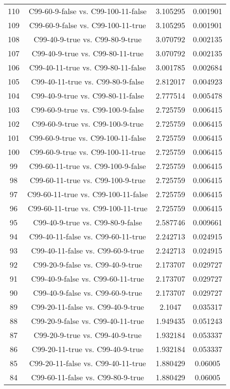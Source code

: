 \documentclass[a4paper,10pt]{article}
\begin{document}
\begin{landscape}
\begin{table}[!htp]
\begin{tabular}{cccc}
110&C99-60-9-false vs. C99-100-11-false&3.105295&0.001901\\
109&C99-60-9-false vs. C99-100-11-true&3.105295&0.001901\\
108&C99-40-9-true vs. C99-80-9-true&3.070792&0.002135\\
107&C99-40-9-true vs. C99-80-11-true&3.070792&0.002135\\
106&C99-40-11-true vs. C99-80-11-false&3.001785&0.002684\\
105&C99-40-11-true vs. C99-80-9-false&2.812017&0.004923\\
104&C99-40-9-true vs. C99-80-11-false&2.777514&0.005478\\
103&C99-60-9-true vs. C99-100-9-false&2.725759&0.006415\\
102&C99-60-9-true vs. C99-100-9-true&2.725759&0.006415\\
101&C99-60-9-true vs. C99-100-11-false&2.725759&0.006415\\
100&C99-60-9-true vs. C99-100-11-true&2.725759&0.006415\\
99&C99-60-11-true vs. C99-100-9-false&2.725759&0.006415\\
98&C99-60-11-true vs. C99-100-9-true&2.725759&0.006415\\
97&C99-60-11-true vs. C99-100-11-false&2.725759&0.006415\\
96&C99-60-11-true vs. C99-100-11-true&2.725759&0.006415\\
95&C99-40-9-true vs. C99-80-9-false&2.587746&0.009661\\
94&C99-40-11-false vs. C99-60-11-true&2.242713&0.024915\\
93&C99-40-11-false vs. C99-60-9-true&2.242713&0.024915\\
92&C99-20-9-false vs. C99-40-9-true&2.173707&0.029727\\
91&C99-40-9-false vs. C99-60-11-true&2.173707&0.029727\\
90&C99-40-9-false vs. C99-60-9-true&2.173707&0.029727\\
89&C99-20-11-false vs. C99-40-9-true&2.1047&0.035317\\
88&C99-20-9-false vs. C99-40-11-true&1.949435&0.051243\\
87&C99-20-9-true vs. C99-40-9-true&1.932184&0.053337\\
86&C99-20-11-true vs. C99-40-9-true&1.932184&0.053337\\
85&C99-20-11-false vs. C99-40-11-true&1.880429&0.06005\\
84&C99-60-11-false vs. C99-80-9-true&1.880429&0.06005\\

\end{tabular}
\end{table}
\end{landscape}
\end{document}
